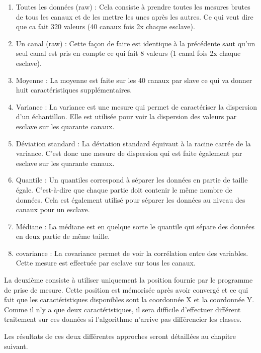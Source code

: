 \begin{enumerate}
	\item Toutes les données (raw) : Cela consiste à prendre toutes les mesures brutes de tous les canaux et de les mettre les unes après les autres. Ce qui veut dire que ca fait 320 valeurs (40 canaux fois 2x chaque esclave).
	\item Un canal (raw) : Cette façon de faire est identique à la précédente saut qu'un seul canal est pris en compte ce qui fait 8 valeurs (1 canal fois 2x chaque esclave).
	\item Moyenne : La moyenne est faite sur les 40 canaux par slave ce qui va donner huit caractéristiques supplémentaires.
	\item Variance : La variance est une mesure qui permet de caractériser la dispersion d'un échantillon. Elle est utilisée pour voir la dispersion des valeurs par esclave sur les quarante canaux. 
	\item Déviation standard : La déviation standard équivaut à la racine carrée de la variance. C'est donc une mesure de dispersion qui est faite également par esclave sur les quarante canaux. 
	\item Quantile : Un quantiles correspond à séparer les données en partie de taille égale. C'est-à-dire que chaque partie doit contenir le même nombre de données. Cela est également utilisé pour séparer les données au niveau des canaux pour un esclave.
	\item Médiane : La médiane est en quelque sorte le quantile qui sépare des données en deux partie de même taille. 
	\item covariance : La covariance permet de voir la corrélation entre des variables. Cette mesure est effectuée par esclave sur tous les canaux.  
\end{enumerate}
 
La deuxième consiste à utiliser uniquement la position fournie par le programme de prise de mesure. Cette position est mémorisée après avoir convergé et ce qui fait que les caractéristiques disponibles sont la coordonnée X et la coordonnée Y. Comme il n'y a que deux caractéristiques, il sera difficile d'effectuer différent traitement sur ces données si l'algorithme n'arrive pas différencier les classes. 

Les résultats de ces deux différentes approches seront détaillées au chapitre suivant. 

